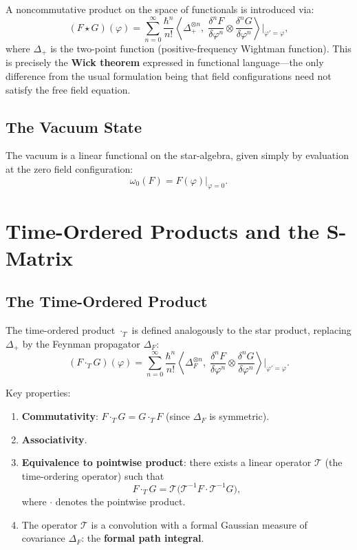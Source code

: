 \documentclass[11pt,a4paper]{article}
\begin{document}
A noncommutative product on the space of functionals is introduced via:
\begin{equation}
  (F \star G)(\varphi) = \sum_{n=0}^{\infty} \frac{\hbar^n}{n!}
  \left\langle \Delta_+^{\otimes n},\;
  \frac{\delta^n F}{\delta\varphi^n} \otimes
  \frac{\delta^n G}{\delta\varphi^n} \right\rangle
  \bigg|_{\varphi'=\varphi},
\end{equation}
where $\Delta_+$ is the two-point function (positive-frequency Wightman
function). This is precisely the \textbf{Wick theorem} expressed in
functional language---the only difference from the usual formulation
being that field configurations need not satisfy the free field equation.

\subsection{The Vacuum State}

The vacuum is a linear functional on the star-algebra, given simply by
evaluation at the zero field configuration:
\begin{equation}
  \omega_0(F) = F(\varphi)\big|_{\varphi=0}.
\end{equation}

\section{Time-Ordered Products and the S-Matrix}

\subsection{The Time-Ordered Product}

The time-ordered product $\cdot_T$ is defined analogously to the star
product, replacing $\Delta_+$ by the Feynman propagator $\Delta_F$:
\begin{equation}
  (F \cdot_T G)(\varphi) = \sum_{n=0}^{\infty} \frac{\hbar^n}{n!}
  \left\langle \Delta_F^{\otimes n},\;
  \frac{\delta^n F}{\delta\varphi^n} \otimes
  \frac{\delta^n G}{\delta\varphi^n} \right\rangle
  \bigg|_{\varphi'=\varphi}.
\end{equation}

Key properties:
\begin{enumerate}[nosep]
  \item \textbf{Commutativity}: $F \cdot_T G = G \cdot_T F$ (since $\Delta_F$
        is symmetric).
  \item \textbf{Associativity}.
  \item \textbf{Equivalence to pointwise product}: there exists a linear
        operator $\mathcal{T}$ (the time-ordering operator) such that
        \[
          F \cdot_T G = \mathcal{T}\bigl(\mathcal{T}^{-1}F \cdot \mathcal{T}^{-1}G\bigr),
        \]
        where $\cdot$ denotes the pointwise product.
  \item The operator $\mathcal{T}$ is a convolution with a formal Gaussian
        measure of covariance $\Delta_F$: the \textbf{formal path integral}.
\end{enumerate}
\end{document}
